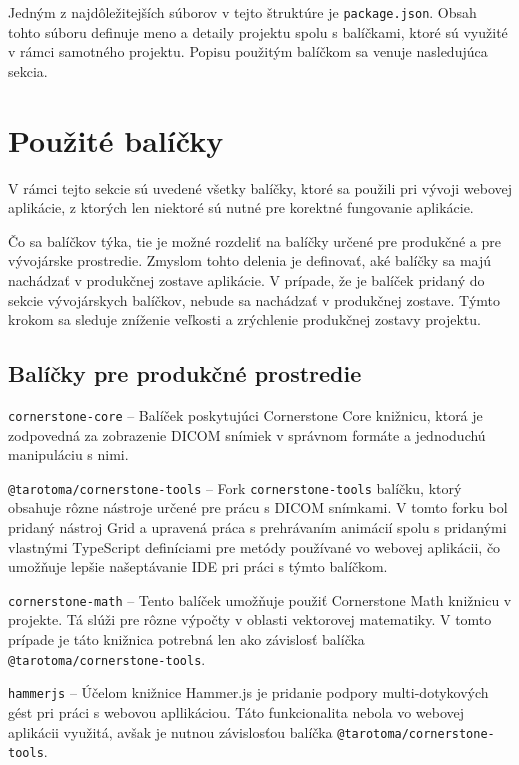 Jedným z najdôležitejších súborov v tejto štruktúre je \texttt{package.json}. Obsah tohto súboru definuje meno a detaily projektu spolu s balíčkami, ktoré sú využité v rámci samotného projektu. Popisu použitým balíčkom sa venuje nasledujúca sekcia.

\section {Použité balíčky}
V rámci tejto sekcie sú uvedené všetky balíčky, ktoré sa použili pri vývoji webovej aplikácie, z ktorých len niektoré sú nutné pre korektné fungovanie aplikácie.

Čo sa balíčkov týka, tie je možné rozdeliť na balíčky určené pre produkčné a pre vývojárske prostredie. Zmyslom tohto delenia je definovať, aké balíčky sa majú nachádzať v produkčnej zostave aplikácie. V prípade, že je balíček pridaný do sekcie vývojárskych balíčkov, nebude sa nachádzať v produkčnej zostave. Týmto krokom sa sleduje zníženie veľkosti a zrýchlenie produkčnej zostavy projektu.

\clearpage

\subsection {Balíčky pre produkčné prostredie}
\texttt{cornerstone-core} -- Balíček poskytujúci Cornerstone Core knižnicu, ktorá je zodpovedná za zobrazenie DICOM snímiek v správnom formáte a jednoduchú manipuláciu s nimi.

\texttt{@tarotoma/cornerstone-tools} -- Fork \texttt{cornerstone-tools} balíčku, ktorý obsahuje rôzne nástroje určené pre prácu s DICOM snímkami. V tomto forku bol pridaný nástroj Grid a upravená práca s prehrávaním animácií spolu s pridanými vlastnými TypeScript definíciami pre metódy používané vo webovej aplikácii, čo umožňuje lepšie našeptávanie IDE pri práci s týmto balíčkom.

\texttt{cornerstone-math} -- Tento balíček umožňuje použiť Cornerstone Math knižnicu v projekte. Tá slúži pre rôzne výpočty v oblasti vektorovej matematiky. V tomto prípade je táto knižnica potrebná len ako závislosť balíčka \texttt{@tarotoma/cornerstone-tools}.

\texttt{hammerjs} -- Účelom knižnice Hammer.js je pridanie podpory multi-dotykových gést pri práci s webovou apllikáciou. Táto funkcionalita nebola vo webovej aplikácii využitá, avšak je nutnou závislosťou balíčka \texttt{@tarotoma/cornerstone-tools}.

